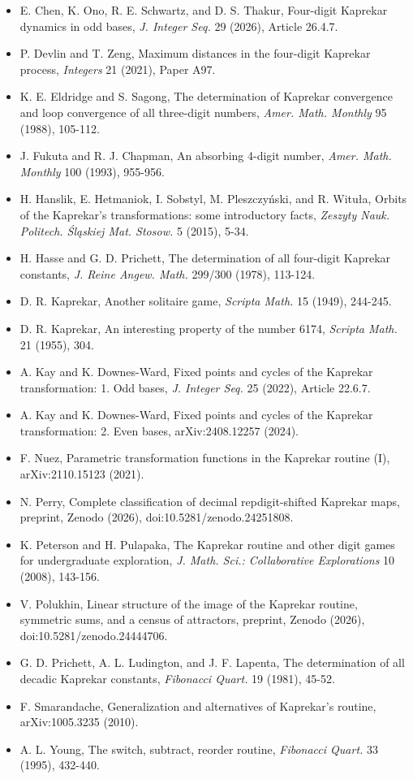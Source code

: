 \documentclass[11pt,letterpaper]{article}
\providecommand{\tightlist}{%
  \setlength{\itemsep}{0pt}\setlength{\parskip}{0pt}}
\theoremstyle{paperstyle}
\theoremstyle{paperstyledef}
\theoremstyle{paperstylerem}
\begin{document}
\begin{itemize}
\tightlist
\item
  E. Chen, K. Ono, R. E. Schwartz, and D. S. Thakur, Four-digit Kaprekar dynamics in odd bases, \emph{J. Integer Seq.} 29 (2026), Article 26.4.7.
\item
  P. Devlin and T. Zeng, Maximum distances in the four-digit Kaprekar process, \emph{Integers} 21 (2021), Paper A97.
\item
  K. E. Eldridge and S. Sagong, The determination of Kaprekar convergence and loop convergence of all three-digit numbers, \emph{Amer. Math. Monthly} 95 (1988), 105-112.
\item
  J. Fukuta and R. J. Chapman, An absorbing 4-digit number, \emph{Amer. Math. Monthly} 100 (1993), 955-956.
\item
  H. Hanslik, E. Hetmaniok, I. Sobstyl, M. Pleszczy\'nski, and R. Witu\l{}a, Orbits of the Kaprekar's transformations: some introductory facts, \emph{Zeszyty Nauk. Politech. \'Sl\k{a}skiej Mat. Stosow.} 5 (2015), 5-34.
\item
  H. Hasse and G. D. Prichett, The determination of all four-digit Kaprekar constants, \emph{J. Reine Angew. Math.} 299/300 (1978), 113-124.
\item
  D. R. Kaprekar, Another solitaire game, \emph{Scripta Math.} 15 (1949), 244-245.
\item
  D. R. Kaprekar, An interesting property of the number 6174, \emph{Scripta Math.} 21 (1955), 304.
\item
  A. Kay and K. Downes-Ward, Fixed points and cycles of the Kaprekar transformation: 1. Odd bases, \emph{J. Integer Seq.} 25 (2022), Article 22.6.7.
\item
  A. Kay and K. Downes-Ward, Fixed points and cycles of the Kaprekar transformation: 2. Even bases, arXiv:2408.12257 (2024).
\item
  F. Nuez, Parametric transformation functions in the Kaprekar routine (I), arXiv:2110.15123 (2021).
\item
  N. Perry, Complete classification of decimal repdigit-shifted Kaprekar maps, preprint, Zenodo (2026), doi:10.5281/zenodo.24251808.
\item
  K. Peterson and H. Pulapaka, The Kaprekar routine and other digit games for undergraduate exploration, \emph{J. Math. Sci.: Collaborative Explorations} 10 (2008), 143-156.
\item
  V. Polukhin, Linear structure of the image of the Kaprekar routine, symmetric sums, and a census of attractors, preprint, Zenodo (2026), doi:10.5281/zenodo.24444706.
\item
  G. D. Prichett, A. L. Ludington, and J. F. Lapenta, The determination of all decadic Kaprekar constants, \emph{Fibonacci Quart.} 19 (1981), 45-52.
\item
  F. Smarandache, Generalization and alternatives of Kaprekar's routine, arXiv:1005.3235 (2010).
\item
  A. L. Young, The switch, subtract, reorder routine, \emph{Fibonacci Quart.} 33 (1995), 432-440.
\end{itemize}
\end{document}
